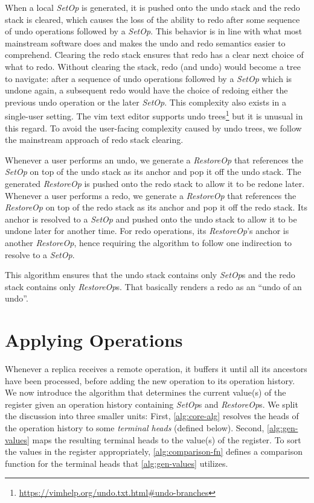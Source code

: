 \documentclass[sigplan]{acmart}
\newcommand{\setopkind}{\textit{SetOp}}
\newcommand{\restopkind}{\textit{RestoreOp}}
\begin{document}
When a local \setopkind{} is generated, it is pushed onto the undo stack and
the redo stack is cleared, which causes the loss of the ability to redo after
some sequence of undo operations followed by a \setopkind{}.
This behavior is in line with what most mainstream software does and makes the
undo and redo semantics easier to comprehend.
Clearing the redo stack ensures that redo has a clear next choice of what to redo.
Without clearing the stack, redo (and undo) would become a tree to navigate:
after a sequence of undo operations followed by a \setopkind{}
which is undone again, a subsequent redo would have the choice of redoing
either the previous undo operation or the later \setopkind{}.
This complexity also exists in a single-user setting.
The vim text editor supports undo trees\footnote{
  \url{https://vimhelp.org/undo.txt.html\#undo-branches}
} but it is unusual in this regard.
To avoid the user-facing complexity caused by undo trees,
we follow the mainstream approach of redo stack clearing.

Whenever a user performs an undo, we generate a \restopkind{} that
references the \setopkind{} on top of the undo stack as its anchor
and pop it off the undo stack.
The generated \restopkind{} is pushed onto the redo stack to allow it to be
redone later.
Whenever a user performs a redo, we generate a \restopkind{} that
references the \restopkind{} on top of the redo stack as its anchor and pop
it off the redo stack.
Its anchor is resolved to a \setopkind{} and
pushed onto the undo stack to allow it to be undone later for another time.
For redo operations, its \restopkind{}'s anchor is another \restopkind{},
hence requiring the algorithm to follow one indirection to resolve to a \setopkind{}.

This algorithm ensures that the undo stack contains only \setopkind{}s and
the redo stack contains only \restopkind{}s.
That basically renders a redo as an ``undo of an undo''.

\section{Applying Operations}\label{sec:implementation}

Whenever a replica receives a remote operation,
it buffers it until all its ancestors have been processed,
before adding the new operation to its operation history.
We now introduce the algorithm that determines the current value(s) of the
register given an operation history containing \setopkind{}s and \restopkind{}s.
We split the discussion into three smaller units:
First, \autoref{alg:core-alg} resolves the heads of the operation
history to some \emph{terminal heads} (defined below).
Second, \autoref{alg:gen-values} maps the resulting terminal
heads to the value(s) of the register.
To sort the values in the register appropriately, \autoref{alg:comparison-fn}
defines a comparison function for the terminal heads that \autoref{alg:gen-values}
utilizes.
\end{document}
